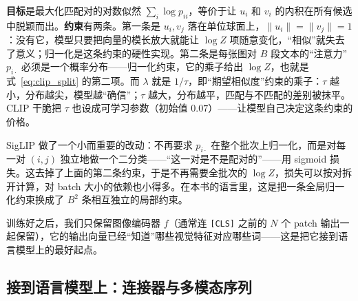 \begin{keyidea}
\textbf{目标}是最大化匹配对的对数似然 $\sum_i \log p_{ii}$，等价于让 $u_i$ 和 $v_i$ 的内积在所有候选中脱颖而出。\textbf{约束}有两条。第一条是 $u_i, v_j$ 落在单位球面上，$\|u_i\| = \|v_j\| = 1$：没有它，模型只要把向量的模长放大就能让 $\log Z$ 项随意变化，“相似”就失去了意义；归一化是这条约束的硬性实现。第二条是每张图对 $B$ 段文本的“注意力” $p_{i\cdot}$ 必须是一个概率分布——归一化约束，它的乘子给出 $\log Z$，也就是式~\eqref{eq:clip_split} 的第二项。而 \textbf{$\lambda$} 就是 $1/\tau$，即“期望相似度”约束的乘子：$\tau$ 越小，分布越尖，模型越“确信”；$\tau$ 越大，分布越平，匹配与不匹配的差别被抹平。CLIP 干脆把 $\tau$ 也设成可学习参数（初始值 $0.07$）——让模型自己决定这条约束的价格。
\end{keyidea}

SigLIP 做了一个小而重要的改动：不再要求 $p_{i\cdot}$ 在整个批次上归一化，而是对每一对 $(i, j)$ 独立地做一个二分类——“这一对是不是配对的”——用 sigmoid 损失。这去掉了上面的第二条约束，于是不再需要全批次的 $\log Z$，损失可以按对拆开计算，对 batch 大小的依赖也小得多。在本书的语言里，这是把一条全局归一化约束换成了 $B^2$ 条相互独立的局部约束。

训练好之后，我们只保留图像编码器 $f$（通常连 \texttt{[CLS]} 之前的 $N$ 个 patch 输出一起保留），它的输出向量已经“知道”哪些视觉特征对应哪些词——这是把它接到语言模型上的最好起点。

\subsection{接到语言模型上：连接器与多模态序列}

